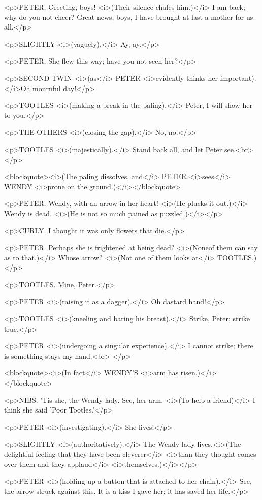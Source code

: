 <p>PETER. Greeting, boys! <i>(Their silence chafes him.)</i> I am
back; why do you not cheer? Great news, boys, I have brought at last
a mother for us all.</p>

<p>SLIGHTLY <i>(vaguely).</i> Ay, ay.</p>

<p>PETER. She flew this way; have you not seen her?</p>

<p>SECOND TWIN <i>(as</i> PETER <i>evidently thinks her
important).</i>Oh mournful day!</p>

<p>TOOTLES <i>(making a break in the paling).</i> Peter, I will show
her to you.</p>

<p>THE OTHERS <i>(closing the gap).</i> No, no.</p>

<p>TOOTLES <i>(majestically).</i> Stand back all, and let Peter
see.<br>
</p>

<blockquote><i>(The paling dissolves, and</i> PETER <i>sees</i> WENDY
<i>prone on the ground.)</i></blockquote>

<p>PETER. Wendy, with an arrow in her heart! <i>(He plucks it
out.)</i> Wendy is dead. <i>(He is not so much pained as
puzzled.)</i></p>

<p>CURLY. I thought it was only flowers that die.</p>

<p>PETER. Perhaps she is frightened at being dead? <i>(Noneof them
can say as to that.)</i> Whose arrow? <i>(Not one of them looks
at</i> TOOTLES.)</p>

<p>TOOTLES. Mine, Peter.</p>

<p>PETER <i>(raising it as a dagger).</i> Oh dastard hand!</p>

<p>TOOTLES <i>(kneeling and baring his breast).</i> Strike, Peter;
strike true.</p>

<p>PETER <i>(undergoing a singular experience).</i> I cannot strike;
there is something stays my hand.<br>
</p>

<blockquote><i>(In fact</i> WENDY'S <i>arm has
risen.)</i></blockquote>

<p>NIBS. 'Tis she, the Wendy lady. See, her arm. <i>(To help a
friend)</i> I think she said 'Poor Tootles.'</p>

<p>PETER <i>(investigating).</i> She lives!</p>

<p>SLIGHTLY <i>(authoritatively).</i> The Wendy lady lives.<i>(The
delightful feeling that they have been cleverer</i> <i>than they
thought comes over them and they applaud</i> <i>themselves.)</i></p>

<p>PETER <i>(holding up a button that is attached to her chain).</i>
See, the arrow struck against this. It is a kiss I gave her; it has
saved her life.</p>


